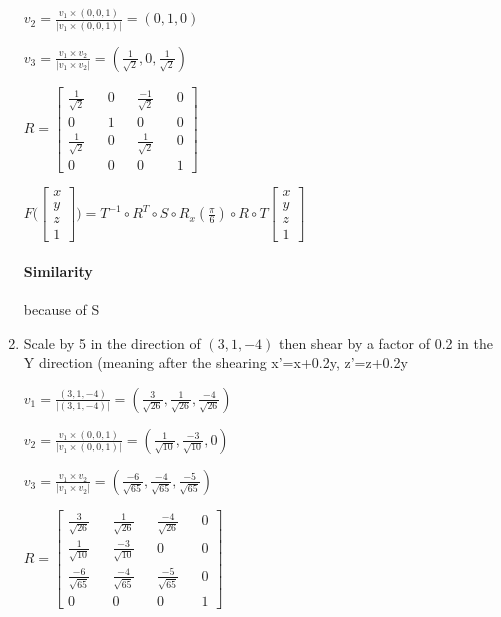 \documentclass{article}
\begin{document}
\begin{enumerate}
        $v_2 = \frac{v_1 \times (0,0,1)}{|v_1 \times (0,0,1)|} = (0,1,0)$
       
        $v_3 = \frac{v_1 \times v_2}{|v_1 \times v_2|}= (\frac{1}{\sqrt{2}}, 0, \frac{1}{\sqrt{2}})$


        $R = \begin{bmatrix}
            \frac{1}{\sqrt{2}} && 0  && \frac{-1}{\sqrt{2}} && 0 \\ 
            0 && 1 && 0 && 0 \\ 
            \frac{1}{\sqrt{2}} && 0 && \frac{1}{\sqrt{2}} && 0 \\ 
            0 && 0 && 0 && 1 
        \end{bmatrix}$

        $F \Bigg (\begin{bmatrix}
            x \\ y \\ z \\ 1
        \end{bmatrix} \Bigg ) = T^{-1} \circ R^T \circ S \circ R_{x}(\frac{\pi}{6})  \circ R \circ  T \begin{bmatrix}
            x \\ y \\ z \\ 1
        \end{bmatrix}$ 

        \paragraph{Similarity} because of S

        \item Scale by 5 in the direction of $(3,1,-4)$ then shear by a factor of 0.2 in the Y direction (meaning after the shearing x'=x+0.2y,  z'=z+0.2y
        
        $v_1 = \frac{(3,1,-4)}{|(3,1,-4)|} = (\frac{3}{\sqrt{26}}, \frac{1}{\sqrt{26}}, \frac{-4}{\sqrt{26}})$

        $v_2 = \frac{v_1 \times (0,0,1)}{|v_1 \times (0,0,1)|} = (\frac{1}{\sqrt{10}}, \frac{-3}{\sqrt{10}}, 0)$

        $v_3 = \frac{v_1 \times v_2}{|v_1 \times v_2|}= (\frac{-6}{\sqrt{65}}, \frac{-4}{\sqrt{65}}, \frac{-5}{\sqrt{65}})$

        $R = \begin{bmatrix}
            \frac{3}{\sqrt{26}} && \frac{1}{\sqrt{26}} && \frac{-4}{\sqrt{26}} && 0 \\ 
            \frac{1}{\sqrt{10}} && \frac{-3}{\sqrt{10}} &&  0 && 0 \\ 
            \frac{-6}{\sqrt{65}} && \frac{-4}{\sqrt{65}} && \frac{-5}{\sqrt{65}} && 0 \\ 
            0 && 0 && 0 && 1 
        \end{bmatrix}$


\end{enumerate}
\end{document}
